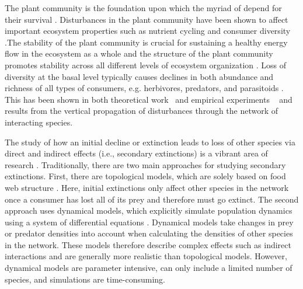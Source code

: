 \documentclass[12pt]{article}
\begin{document}
\begin{spacing}{2.0}
     The plant community is the foundation upon which the myriad of depend for their survival \citep{}. Disturbances in the plant community have been shown to affect important ecosystem properties such as nutrient cycling \citep{} and consumer diversity \citep{scherber2010bottom,Baiser2013}.The stability of the plant community is crucial for sustaining a healthy energy flow in the ecosystem as a whole \citep{Rosenblatt2016} and the structure of the plant community promotes stability across all different levels of ecosystem organization \citep{proulx2010diversity,scherber2010bottom}. Loss of diversity at the basal level typically causes declines in both abundance and richness of all types of consumers, e.g. herbivores, predators, and parasitoids \citep{scherber2010bottom}.
     This has been shown in both theoretical work~\citep{} and empirical experiments ~\citep{} and results from the vertical propagation of disturbances through the network of interacting species.
    
    The study of how an initial decline or extinction leads to loss of other species via direct and indirect effects (i.e., secondary extinctions) is a vibrant area of research \citep{curtsdotter2011robustness, dunne2009cascading, Eklof2006}. Traditionally, there are two main approaches for studying secondary extinctions. First, there are topological models, which are solely based on food web structure \citep{dunne2009cascading}. Here, initial extinctions only affect other species in the network once a consumer has lost all of its prey and therefore must go extinct. The second approach uses dynamical models, which explicitly simulate population dynamics using a system of differential equations \citep{binzer2011susceptibility}. Dynamical models take changes in prey or predator densities into account when calculating the densities of other species in the network. These models therefore describe complex effects such as indirect interactions and are generally more realistic than topological models. However, dynamical models are parameter intensive, can only include a limited number of species, and simulations are time-consuming. 
    

\end{spacing}
\end{document}
